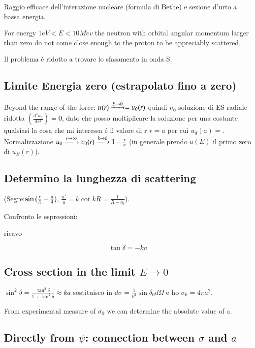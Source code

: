 \documentclass[main.tex]{subfiles}
\begin{document}
 Raggio efficace dell'interazione nucleare (formula di Bethe) e sezione d'urto a bassa energia.

For energy $1eV<E<10Mev$ the neutron with orbital angular momentum larger than zero do not come close enough to the proton to be appreciably scattered.

Il problema \'e ridotto a trovare lo sfasamento in onda S.

\subsection{Limite Energia zero (estrapolato fino a zero)}

Beyond the range of the force: $u(r)\xrightarrow{E\rightarrow0}=u_0(r)$ quindi $u_0$ soluzione di ES radiale ridotta $(\frac{d^2u_0}{dr^2})=0$, dato che posso moltiplicare la soluzione per una costante qualsiasi la cosa che mi interessa \'e il valore di r $r=a$ per cui $u_0(a)=$. Normalizzazione $u_0\xrightarrow{r\rightarrow\infty}v_0(r)\xrightarrow{k\rightarrow0}1-\frac{r}{a}$ (in generale prendo $a(E)$ il primo zero di $u_E(r)$).

\subsection{Determino la lunghezza di scattering}
(Segre:$\sin{(\frac{r}{\lambdabar}-\frac{a}{\lambdabar})}$, $\frac{u'}{u}=k\cot{kR}=\frac{1}{R-a_t}$).

Confronto le espressioni:

ricavo 

\begin{equation*}
\tan{\delta}=-ka
\end{equation*}

\subsection{Cross section in the limit $E\rightarrow0$}
 $\sin^2{\delta}=\frac{\tan^2{\delta}}{1+\tan^2{\delta}}\approx ka$ sostituisco in $d\sigma=\frac{1}{k^2}\sin{\delta_0}d\Omega$ e ho $\sigma_0=4\pi a^2$.
 
From experimental measure of $\sigma_0$ we can determine the absolute value of a.

\subsection{Directly from $\psi$: connection between $\sigma$ and $a$}
\end{document}
